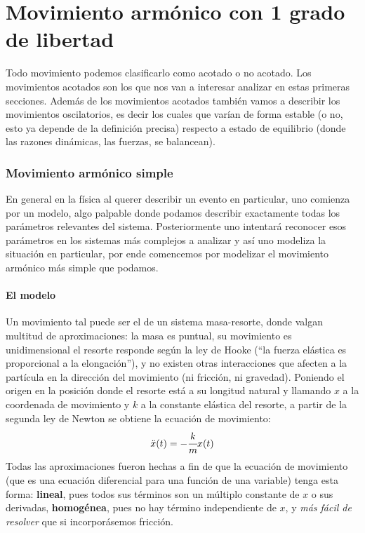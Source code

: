 \documentclass[a4paper,spanish]{article}
\numberwithin{equation}{section}
\begin{document}
\part{Movimiento arm\'onico con 1 grado de libertad}

Todo movimiento podemos clasificarlo como acotado o no acotado.
Los movimientos acotados son los que nos van a interesar analizar
en estas primeras secciones. Adem\'as de los movimientos acotados
tambi\'en vamos a describir los movimientos oscilatorios, es decir
los cuales que var\'ian de forma estable (o no, esto ya depende de
la definici\'on precisa) respecto a estado de equilibrio (donde las
razones din\'amicas, las fuerzas, se balancean).

\section{Movimiento arm\'onico simple}

En general en la f\'isica al querer describir un evento en
particular, uno comienza por un modelo, algo palpable donde
podamos describir exactamente todas los par\'ametros relevantes
del sistema. Posteriormente uno intentar\'a reconocer esos
par\'ametros en los sistemas m\'as complejos a analizar y as\'i
uno modeliza la situaci\'on en particular, por ende comencemos por
modelizar el movimiento arm\'onico m\'as simple que podamos.

\subsection{El modelo}

Un movimiento tal puede ser el de un sistema masa-resorte, donde valgan multitud de aproximaciones: la masa es puntual, su movimiento es unidimensional el resorte responde seg\'un la ley de Hooke (``la fuerza el\'astica es proporcional a la elongaci\'on''), y no existen otras interacciones que afecten a la part\'icula en la direcci\'on del movimiento (ni fricci\'on, ni gravedad). Poniendo el origen en la posici\'on donde el resorte est\'a a su longitud natural y llamando $x$ a la coordenada de movimiento y $k$ a la constante el\'astica del resorte, a partir de la segunda ley de Newton se obtiene la ecuaci\'on de movimiento:
    \begin{equation*}
        \ddot{x}(t) = - \cfrac{k}{m} x(t)
    \end{equation*}
Todas las aproximaciones fueron hechas a fin de que la ecuaci\'on de movimiento (que es una ecuaci\'on diferencial para una funci\'on de una variable) tenga esta forma: \textbf{lineal}, pues todos sus t\'erminos son un m\'ultiplo constante de $x$ o sus derivadas, \textbf{homog\'enea}, pues no hay t\'ermino independiente de $x$, y \textit{m\'as f\'acil de resolver} que si incorpor\'asemos fricci\'on.
\end{document}
